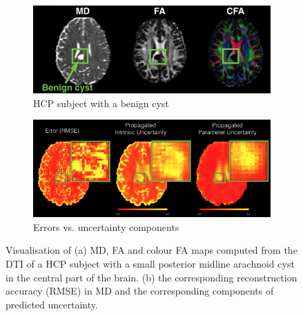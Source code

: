 \begin{figure}[ht]
	\centering
	\begin{subfigure}{0.9\textwidth}
		\caption{HCP subject with a benign cyst}
		\includegraphics[width=\linewidth]{chapter_3/figures/fig_12.png}
	\end{subfigure}
	\begin{subfigure}{0.9\textwidth}
		\vspace{3mm}
		\caption{Errors vs. uncertainty components}
		\includegraphics[width=\linewidth]{chapter_3/figures/fig_9_2.png}
	\end{subfigure}
	\caption{Visualisation of (a) MD, FA and colour FA maps computed from the DTI of a HCP subject with a small posterior midline arachnoid cyst in the central part of the brain. (b) the corresponding reconstruction accuracy (RMSE) in MD and the corresponding components of predicted uncertainty. }
	\label{fig:healthy_abnormal}
\end{figure}



